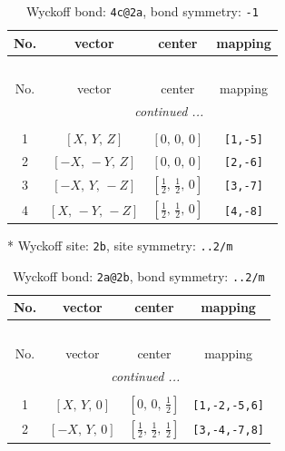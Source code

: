 \documentclass[fleqn,8pt]{jsarticle}
\begin{document}
\renewcommand{\arraystretch}{1.2}
\begin{longtable}{cccc}
\caption{Wyckoff bond: {\tt 4c@2a}, bond symmetry: {\tt -1}}
 \\
 \hline \hline
No. & vector & center & mapping \\ \hline \endfirsthead

\multicolumn{3}{l}{\tablename\ \thetable{}} \\
 \hline \hline
No. & vector & center & mapping \\ \hline \endhead

 \hline \hline
\multicolumn{3}{r}{\footnotesize\it continued ...} \\ \endfoot

 \hline \hline
\multicolumn{3}{r}{} \\ \endlastfoot

1 & $\left[ X,\, Y,\, Z \right]$ & $\left[ 0,\, 0,\, 0 \right]$ & {\tt [1,-5]} \\ \hline
2 & $\left[ - X,\, - Y,\, Z \right]$ & $\left[ 0,\, 0,\, 0 \right]$ & {\tt [2,-6]} \\ \hline
3 & $\left[ - X,\, Y,\, - Z \right]$ & $\left[ \frac{1}{2},\, \frac{1}{2},\, 0 \right]$ & {\tt [3,-7]} \\ \hline
4 & $\left[ X,\, - Y,\, - Z \right]$ & $\left[ \frac{1}{2},\, \frac{1}{2},\, 0 \right]$ & {\tt [4,-8]} \\
\end{longtable}
* Wyckoff site: {\tt 2b}, site symmetry: {\tt ..2/m}
\renewcommand{\arraystretch}{1.2}
\begin{longtable}{cccc}
\caption{Wyckoff bond: {\tt 2a@2b}, bond symmetry: {\tt ..2/m}}
 \\
 \hline \hline
No. & vector & center & mapping \\ \hline \endfirsthead

\multicolumn{3}{l}{\tablename\ \thetable{}} \\
 \hline \hline
No. & vector & center & mapping \\ \hline \endhead

 \hline \hline
\multicolumn{3}{r}{\footnotesize\it continued ...} \\ \endfoot

 \hline \hline
\multicolumn{3}{r}{} \\ \endlastfoot

1 & $\left[ X,\, Y,\, 0 \right]$ & $\left[ 0,\, 0,\, \frac{1}{2} \right]$ & {\tt [1,-2,-5,6]} \\ \hline
2 & $\left[ - X,\, Y,\, 0 \right]$ & $\left[ \frac{1}{2},\, \frac{1}{2},\, \frac{1}{2} \right]$ & {\tt [3,-4,-7,8]} \\
\end{longtable}
\end{document}

